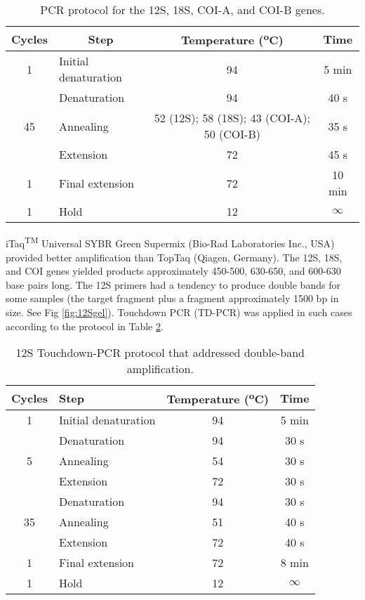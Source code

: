 \begin{table}[H]
\renewcommand{\arraystretch}{0.5}
	\centering
	\caption{PCR protocol for the 12S, 18S, COI-A, and COI-B genes.}
	\label{tab:PCRprotocol}
	\begin{tabular}{@{}clcc@{}}
		\toprule
		\textbf{Cycles} & \multicolumn{1}{c}{\textbf{Step}} & \textbf{Temperature (\textsuperscript{o}C)} & \textbf{Time} \\ \midrule
		1 & Initial denaturation & 94 & 5 min \\ \hline 
		\multirow{3}{*}{45} & Denaturation & 94 & 40 s \\ 
		& Annealing & 52 (12S); 58 (18S); 43 (COI-A); 50 (COI-B) & 35 s \\
		& Extension & 72 & 45 s \\ \hline 
		1 & Final extension & 72 & 10 min \\ \hline
		1 & Hold & 12 & $\infty$ \\ \bottomrule
	\end{tabular}
\end{table}

\noindent iTaq\textsuperscript{TM} Universal SYBR\textsuperscript{\textregistered} Green Supermix (Bio-Rad Laboratories Inc., USA) provided better amplification than TopTaq\textsuperscript{\textregistered} (Qiagen, Germany). The 12S, 18S, and COI genes yielded products approximately 450-500, 630-650, and 600-630 base pairs long. 
The 12S primers had a tendency to produce double bands for some samples (the target fragment plus a fragment approximately 1500 bp in size. See Fig \ref{fig:12Sgel}). Touchdown PCR (TD-PCR) was applied in such cases according to the protocol in Table \ref{tab:TDPCRprotocol}. 

\begin{table}[H]
\renewcommand{\arraystretch}{0.5}
\centering
\caption{12S Touchdown-PCR protocol that addressed double-band amplification.}
	\label{tab:TDPCRprotocol}
\begin{tabular}{@{}clcc@{}}
\toprule
\textbf{Cycles} & \textbf{Step} & \textbf{Temperature (\textsuperscript{o}C)} & \textbf{Time} \\ \midrule
1 & Initial denaturation & 94 & 5 min \\ \hline 
\multirow{3}{*}{5} & Denaturation & 94 & 30 s \\
 & Annealing & 54 & 30 s \\
 & Extension & 72 & 30 s \\  \hline
\multirow{3}{*}{35} & Denaturation & 94 & 30 s \\
 & Annealing & 51 & 40 s \\
 & Extension & 72 & 40 s \\  \hline
1 & Final extension & 72 & 8 min \\  \hline
1 & Hold & 12 & $\infty$ \\ \bottomrule
\end{tabular}
\end{table}

